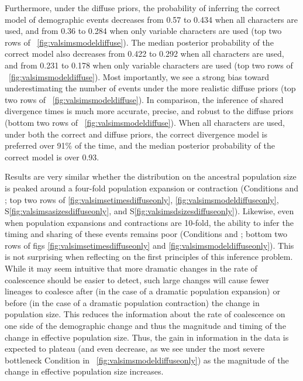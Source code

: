 \ifembed{

}{}

Furthermore, under the diffuse priors, the probability of inferring the correct
model of demographic events decreases from 0.57 to 0.434 when all characters
are used, and from 0.36 to 0.284 when only variable characters are used
(top two rows of \fig{}~\ref{fig:valsimsmodeldiffuse}).
The median posterior probability of the correct model also decreases from
0.422 to 0.292 when all characters are used,
and from 0.231 to 0.178 when only variable characters are used
(top two rows of \fig{}~\ref{fig:valsimsmodeldiffuse}).
Most importantly, we see a strong bias toward underestimating the number of
events under the more realistic diffuse priors
(top two rows of \fig{}~\ref{fig:valsimsmodeldiffuse}).
In comparison, the inference of shared divergence times is much more accurate,
precise, and robust to the diffuse priors
(bottom two rows of \fig{}~\ref{fig:valsimsmodeldiffuse}).
When all characters are used, under both the correct and diffuse
priors, the correct divergence model is preferred over 91\% of the time,
and the median posterior probability of the correct model is over
0.93.

\ifembed{

}{}

Results are very similar whether the distribution on the
ancestral population size is peaked around a four-fold population
expansion or contraction
(Conditions \msimfourinc and \msimfourdec;
top two rows of \figs
\ref{fig:valsimsetimesdiffuseonly},
\ref{fig:valsimsmodeldiffuseonly},
S\ref{fig:valsimsasizesdiffuseonly},
and
S\ref{fig:valsimsdsizesdiffuseonly}).
Likewise, even when population expansions
and contractions are 10-fold, the ability to infer
the timing and sharing of these events remains
poor
(Conditions \msimteninc and \msimtendec;
bottom two rows of figs
\ref{fig:valsimsetimesdiffuseonly} and 
\ref{fig:valsimsmodeldiffuseonly}).
This is not surprising when reflecting on the first principles of this
inference problem.
While it may seem intuitive that more dramatic changes in the rate
of coalescence should be easier to detect, such large changes
will cause fewer lineages to coalesce
after (in the case of a dramatic population expansion)
or
before (in the case of a dramatic population contraction)
the change in population size.
This reduces the information about the rate of coalescence on one side of the
demographic change and thus the magnitude and timing of the change in effective
population size.
Thus, the gain in information in the data is expected to plateau
(and even decrease, as we see under the most severe bottleneck Condition
\msimtendec in \fig{}~\ref{fig:valsimsmodeldiffuseonly})
as the magnitude of the change in effective population size increases.

